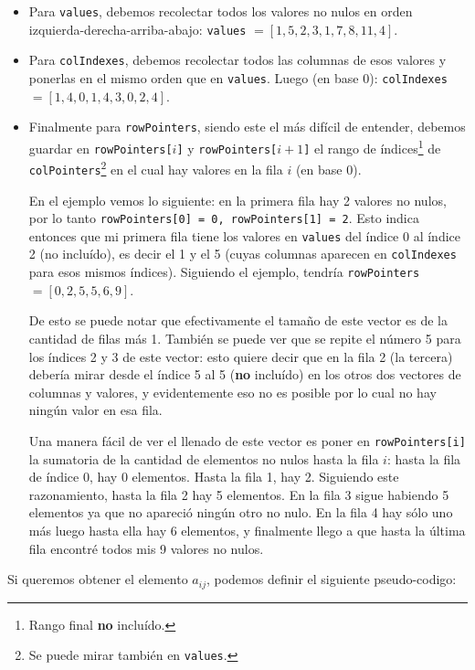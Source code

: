 	\begin{itemize} 
 \item Para \texttt{values}, debemos recolectar todos los valores no nulos en orden izquierda-derecha-arriba-abajo: \texttt{values} $= [1,5,2,3,1,7,8,11,4].$

 \item Para \texttt{colIndexes}, debemos recolectar todos las columnas de esos valores y ponerlas en el mismo orden que en \texttt{values}. Luego (en base 0): \texttt{colIndexes} $= [1,4,0,1,4,3,0,2,4]. $

 \item Finalmente para \texttt{rowPointers}, siendo este el más difícil de entender, debemos guardar en \texttt{rowPointers[$i$]} y \texttt{rowPointers[$i+1$]} el rango de índices\footnote{Rango final \textbf{no} incluído.} de \texttt{colPointers}\footnote{Se puede mirar también en \texttt{values}.} en el cual hay valores en la fila $i$ (en base 0). 
 
 En el ejemplo vemos lo siguiente: en la primera fila hay 2 valores no nulos, por lo tanto \texttt{rowPointers[0] = 0, rowPointers[1] = 2}. Esto indica entonces que mi primera fila tiene los valores en \texttt{values} del índice 0 al índice 2 (no incluído), es decir el 1 y el 5 (cuyas columnas aparecen en \texttt{colIndexes} para esos mismos índices). Siguiendo el ejemplo, tendría \texttt{rowPointers} $ = [0,2,5,5,6,9]$. 
 
 De esto se puede notar que efectivamente el tamaño de este vector es de la cantidad de filas más 1. También se puede ver que se repite el número 5 para los índices 2 y 3 de este vector: esto quiere decir que en la fila 2 (la tercera) debería mirar desde el índice 5 al 5 (\textbf{no} incluído) en los otros dos vectores de columnas y valores, y evidentemente eso no es posible por lo cual no hay ningún valor en esa fila.
 
 Una manera fácil de ver el llenado de este vector es poner en \texttt{rowPointers[i]} la sumatoria de la cantidad de elementos no nulos hasta la fila $i$: hasta la fila de índice 0, hay 0 elementos. Hasta la fila 1, hay 2. Siguiendo este razonamiento, hasta la fila 2 hay 5 elementos. En la fila 3 sigue habiendo 5 elementos ya que no apareció ningún otro no nulo. En la fila 4 hay sólo uno más luego hasta ella hay 6 elementos, y finalmente llego a que hasta la última fila encontré todos mis 9 valores no nulos.
		\end{itemize}

	Si queremos obtener el elemento $a_{ij}$, podemos definir el siguiente pseudo-codigo:

